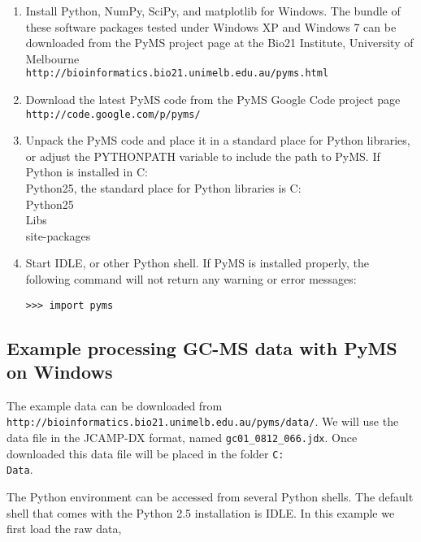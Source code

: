 \begin{enumerate}

\item Install Python, NumPy, SciPy, and matplotlib for Windows.
The bundle of these software packages tested under Windows XP and
Windows 7 can be downloaded from the PyMS project page at the
Bio21 Institute, University of Melbourne\\
{\tt http://bioinformatics.bio21.unimelb.edu.au/pyms.html}

\item Download the latest PyMS code from the PyMS Google Code
project page\\
{\tt http://code.google.com/p/pyms/}

\item Unpack the PyMS code and place it in a standard place for
Python libraries, or adjust the PYTHONPATH variable to include
the path to PyMS. If Python is installed in C:\\Python25, the
standard place for Python libraries is C:\\Python25\\Libs\\site-packages

\item Start IDLE, or other Python shell. If PyMS is installed
properly, the following command will not return any warning or
error messages:

\begin{verbatim}
>>> import pyms
\end{verbatim}

\end{enumerate}

\subsection{Example processing GC-MS data with PyMS on Windows}

The example data can be downloaded from\\
{\tt http://bioinformatics.bio21.unimelb.edu.au/pyms/data/}.
We will use the data file in the JCAMP-DX format, named
{\tt gc01\_0812\_066.jdx}. Once downloaded this data file
will be placed in the folder {\tt C:\\Data}.

The Python environment can be accessed from several Python
shells. The default shell that comes with the Python 2.5
installation is IDLE. In this example we first load the
raw data,

